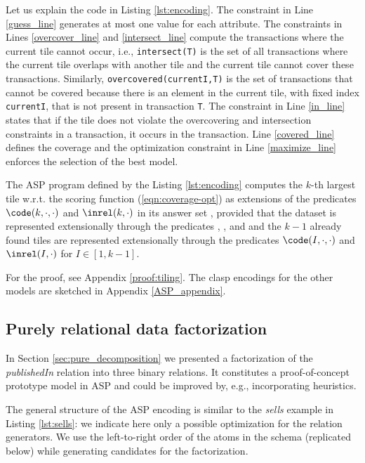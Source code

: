 Let us explain the code in Listing \ref{lst:encoding}. The constraint in Line \ref{guess_line} generates at most one value for each attribute. The constraints in Lines \ref{overcover_line} and \ref{intersect_line} compute the transactions where the current tile cannot occur, i.e., \texttt{intersect(T)} is the set of all transactions where the current tile overlaps with another tile and the current tile cannot cover these transactions. Similarly, \texttt{overcovered(currentI,T)} is the set of transactions that cannot be covered because there is an element in the current tile, with fixed index \texttt{currentI}, that is not present in transaction \texttt{T}. The constraint in Line \ref{in_line} states that if the tile does not violate the overcovering and intersection constraints in a transaction, it occurs in the transaction. Line \ref{covered_line} defines the coverage and the optimization constraint in Line \ref{maximize_line} enforces the selection of the best model.

\begin{theorem}\label{theorem:tiling}
 The ASP program \pprog defined by the Listing \ref{lst:encoding} computes the $k$-th largest tile w.r.t. the scoring function \maxcover (\ref{eqn:coverage-opt}) as extensions of the predicates $\code(k,\cdot,\cdot)$ and $\inrel(k,\cdot)$ in its answer set \as, provided that 
the dataset is represented extensionally through the predicates \db, \valid, and \col 
and the $k-1$ already found tiles are represented extensionally through the predicates $\code(I,\cdot,\cdot)$ and $\inrel(I,\cdot)$ for $I \in [1,k-1]$.
\end{theorem}
For the proof, see Appendix \ref{proof:tiling}.
The clasp encodings for the other models are sketched in Appendix \ref{ASP_appendix}.

\subsection{Purely relational data factorization}
In Section \ref{sec:pure_decomposition} we presented a factorization of the \emph{publishedIn} relation into three binary relations. It constitutes a proof-of-concept prototype model in ASP and could be improved by, e.g., incorporating heuristics. %

The general structure of the ASP encoding is similar to the \emph{sells} example in Listing \ref{lst:sells}: we indicate here only a possible optimization for the relation generators.  We use the left-to-right order of the atoms in the schema (replicated below) while generating candidates for the factorization.

